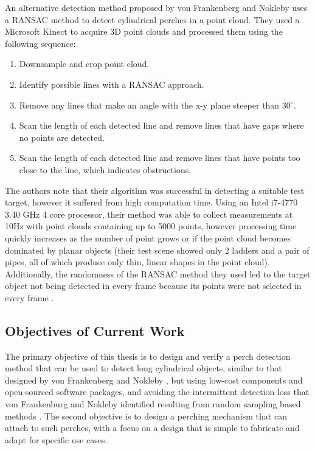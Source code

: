 An alternative detection method proposed by von Frankenberg and Nokleby uses a RANSAC method to detect cylindrical perches in a point cloud. They used a Microsoft
Kinect to acquire 3D point clouds and processed them using the following sequence:
\begin{enumerate}
    \item Downsample and crop point cloud.
    \item Identify possible lines with a RANSAC approach.
    \item Remove any lines that make an angle with the x-y plane steeper than $30^\circ$.
    \item Scan the length of each detected line and remove lines that have gaps where no points are detected.
    \item Scan the length of each detected line and remove lines that have points too close to the line, which indicates obstructions.
\end{enumerate}

The authors note that their algorithm was successful in detecting a suitable test target, however it suffered from high computation time.
Using an Intel i7-4770 3.40 GHz 4 core processor, their method was able to collect measurements at 10Hz with point clouds containing up to 5000
points, however processing time quickly increases as the number of point grows or if the point cloud becomes dominated by planar objects (their test 
scene showed only 2 ladders and a pair of pipes, all of which produce only thin, linear shapes in the point cloud). Additionally, the randomness
of the RANSAC method they used led to the target object not being detected in every frame because its points were not selected in every frame \cite{von_frankenberg_detection_2020}.


\subsection{Objectives of Current Work}

The primary objective of this thesis is to design and verify a perch detection method 
that can be used to detect long cylindrical objects, similar to that designed by von Frankenberg and Nokleby \cite{von_frankenberg_detection_2020},
but using low-cost components and open-sourced software packages, and avoiding the intermittent detection loss 
that von Frankenburg and Nokleby identified resulting from random sampling based methods \cite{von_frankenberg_detection_2020}.
The second objective is to design a perching mechanism that can attach to such perches, with a focus on 
a design that is simple to fabricate and adapt for specific use cases.